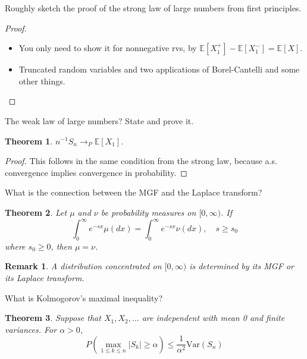 \documentclass[avery5388,grid,frame]{flashcards}
\newcommand{\E}{\mathbb{E}}
\newcommand{\Var}{\text{Var}}
\newtheorem*{theorem}{Theorem}
\newtheorem*{remark}{Remark}
\begin{document}
\begin{flashcard}
    {Roughly sketch the proof of the strong law of large numbers from first principles.}
    \begin{proof}
        \begin{itemize}
            \item You only need to show it for nonnegative rvs, by $\E[X_1^+] - \E[X_1^-] = \E[X]$.
            \item Truncated random variables and two applications of Borel-Cantelli and some other things.
        \end{itemize}
    \end{proof}
\end{flashcard}


\begin{flashcard}
    {The weak law of large numbers? State and prove it.}
    \begin{theorem}
        $n^{-1} S_n \rightarrow_P \E[X_1]$.
    \end{theorem}

    \begin{proof}
        This follows in the same condition from the strong law, because a.s. convergence implies convergence in probability.
    \end{proof}
\end{flashcard}


\begin{flashcard}
    {What is the connection between the MGF and the Laplace transform?}
    \begin{theorem}
        Let $\mu$ and $\nu$ be probability measures on $[0,\infty)$. If
        $$\int_0^\infty e^{-sx} \mu(dx) = \int_0^\infty e^{-sx} \nu(dx), \quad s \geq s_0$$
        where $s_0 \geq 0$, then $\mu = \nu$.
    \end{theorem}
    \begin{remark}
        A distribution concentrated on $[0,\infty)$ is determined by its MGF or its Laplace transform.
    \end{remark}
\end{flashcard}


\begin{flashcard}
    {What is Kolmogorov's maximal inequality?}
    \begin{theorem}
        Suppose that $X_1, X_2, \dots$ are independent with mean 0 and finite variances. For $\alpha > 0$,
        $$P( \max_{1 \leq k \leq n} |S_k| \geq \alpha) \leq \frac 1 {\alpha^2} \Var(S_n)$$
    \end{theorem}
\end{flashcard}
\end{document}
